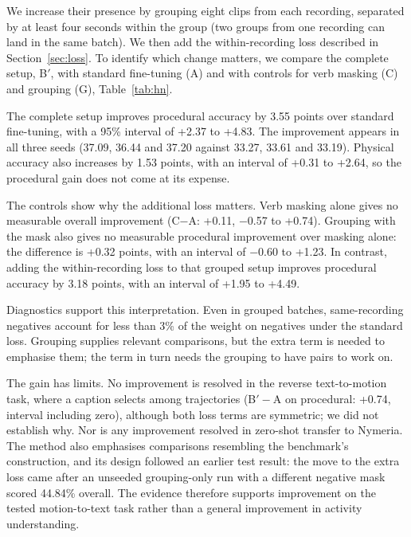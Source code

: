 \documentclass[10pt,twocolumn,letterpaper]{article}
\begin{document}
We increase their presence by grouping eight clips from each recording, separated by at least four seconds within
the group (two groups from one recording can land in the same batch). We then add the within-recording loss
described in Section~\ref{sec:loss}. To identify which change matters, we compare the complete setup, B$'$, with
standard fine-tuning (A) and with controls for verb masking (C) and grouping (G), Table~\ref{tab:hn}.

The complete setup improves procedural accuracy by 3.55 points over standard fine-tuning, with a 95\% interval of
+2.37 to +4.83. The improvement appears in all three seeds (37.09, 36.44 and 37.20 against 33.27, 33.61 and 33.19).
Physical accuracy also increases by 1.53 points, with an interval of +0.31 to +2.64, so the procedural gain does not
come at its expense.

The controls show why the additional loss matters. Verb masking alone gives no measurable overall improvement
(C$-$A: +0.11, $-$0.57 to +0.74). Grouping with the mask also gives no measurable procedural improvement over
masking alone: the difference is +0.32 points, with an interval of $-$0.60 to +1.23. In contrast, adding the
within-recording loss to that grouped setup improves procedural accuracy by 3.18 points, with an interval of +1.95
to +4.49.

Diagnostics support this interpretation. Even in grouped batches, same-recording negatives account for less than
3\% of the weight on negatives under the standard loss. Grouping supplies relevant comparisons, but the extra term
is needed to emphasise them; the term in turn needs the grouping to have pairs to work on.

The gain has limits. No improvement is resolved in the reverse text-to-motion task, where a caption selects among
trajectories (B$'-$A on procedural: +0.74, interval including zero), although both loss terms are symmetric; we did
not establish why. Nor is any improvement resolved in zero-shot transfer to Nymeria. The method also emphasises
comparisons resembling the benchmark's construction, and its design followed an earlier test result: the move to
the extra loss came after an unseeded grouping-only run with a different negative mask scored 44.84\% overall. The
evidence therefore supports improvement on the tested motion-to-text task rather than a general improvement in
activity understanding.
\end{document}
